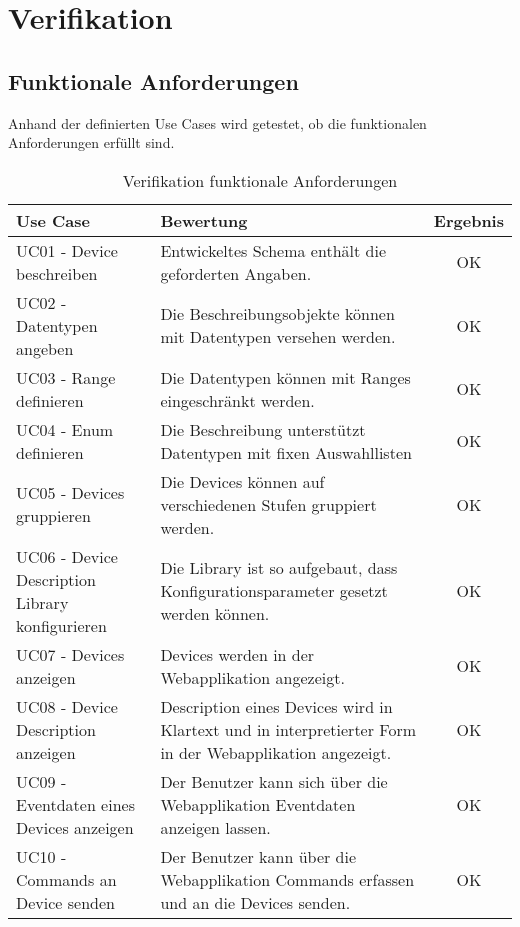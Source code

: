 \chapter{Verifikation}
\label{chap:verification}

\section{Funktionale Anforderungen}
Anhand der definierten Use Cases wird getestet, ob die funktionalen Anforderungen erfüllt sind.

\begin{table}[H]
\begin{tabularx}{\textwidth}{|l|X|c|}

 \hline \rowcolor{lightgray}
 {\bf Use Case } & {\bf Bewertung } & {\bf Ergebnis} \\  \hline
 
 UC01 - Device beschreiben & Entwickeltes Schema enthält die geforderten Angaben. & OK \\ \hline

 UC02 - Datentypen angeben   & Die Beschreibungsobjekte können mit Datentypen versehen werden. & OK \\ \hline

 UC03 - Range definieren    & Die Datentypen können mit Ranges eingeschränkt werden. & OK \\ \hline

 UC04 - Enum definieren     & Die Beschreibung unterstützt Datentypen mit fixen Auswahllisten & OK \\ \hline

 UC05 - Devices gruppieren & Die Devices können auf verschiedenen Stufen gruppiert werden. & OK \\ \hline

 UC06 - Device Description Library konfigurieren & Die Library ist so aufgebaut, dass  Konfigurationsparameter gesetzt werden können. & OK \\ \hline

 UC07 - Devices anzeigen & Devices werden in der Webapplikation angezeigt. & OK \\ \hline

 UC08 - Device Description anzeigen & Description eines Devices wird in Klartext und in interpretierter Form in der Webapplikation angezeigt. & OK \\ \hline

 UC09 - Eventdaten eines Devices anzeigen & Der Benutzer kann sich über die Webapplikation Eventdaten anzeigen lassen. & OK \\ \hline

 UC10 - Commands an Device senden & Der Benutzer kann über die Webapplikation Commands erfassen und an die Devices senden. & OK \\ \hline

\end{tabularx}
\caption{Verifikation funktionale Anforderungen}
\end{table}





